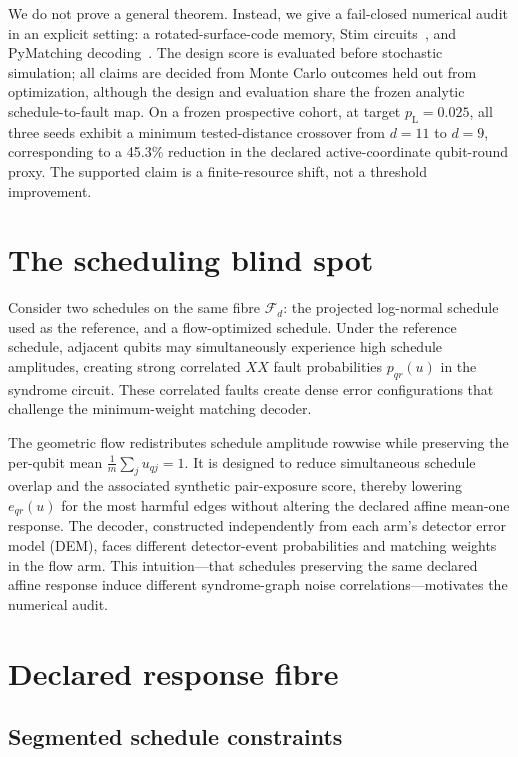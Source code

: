 \documentclass[11pt]{article}
\newcommand{\pL}{p_{\mathrm L}}
\newcommand{\F}{\mathcal{F}}
\begin{document}
We do not prove a general theorem. Instead, we give a fail-closed numerical audit in an explicit setting: a rotated-surface-code memory, Stim circuits~\cite{Gidney2021}, and PyMatching decoding~\cite{Higgott2022}. The design score is evaluated before stochastic simulation; all claims are decided from Monte Carlo outcomes held out from optimization, although the design and evaluation share the frozen analytic schedule-to-fault map. On a frozen prospective cohort, at target \(\pL=0.025\), all three seeds exhibit a minimum tested-distance crossover from \(d=11\) to \(d=9\), corresponding to a 45.3\% reduction in the declared active-coordinate qubit-round proxy. The supported claim is a finite-resource shift, not a threshold improvement.

\section{The scheduling blind spot}

Consider two schedules on the same fibre \(\F_d\): the projected log-normal schedule used as the reference, and a flow-optimized schedule. Under the reference schedule, adjacent qubits may simultaneously experience high schedule amplitudes, creating strong correlated \(XX\) fault probabilities \(p_{qr}(u)\) in the syndrome circuit. These correlated faults create dense error configurations that challenge the minimum-weight matching decoder.

The geometric flow redistributes schedule amplitude rowwise while preserving the per-qubit mean \(\frac{1}{m}\sum_j u_{qj}=1\). It is designed to reduce simultaneous schedule overlap and the associated synthetic pair-exposure score, thereby lowering \(e_{qr}(u)\) for the most harmful edges without altering the declared affine mean-one response. The decoder, constructed independently from each arm's detector error model (DEM), faces different detector-event probabilities and matching weights in the flow arm. This intuition---that schedules preserving the same declared affine response induce different syndrome-graph noise correlations---motivates the numerical audit.

\section{Declared response fibre}
\label{sec:fibre}

\subsection{Segmented schedule constraints}
\end{document}
